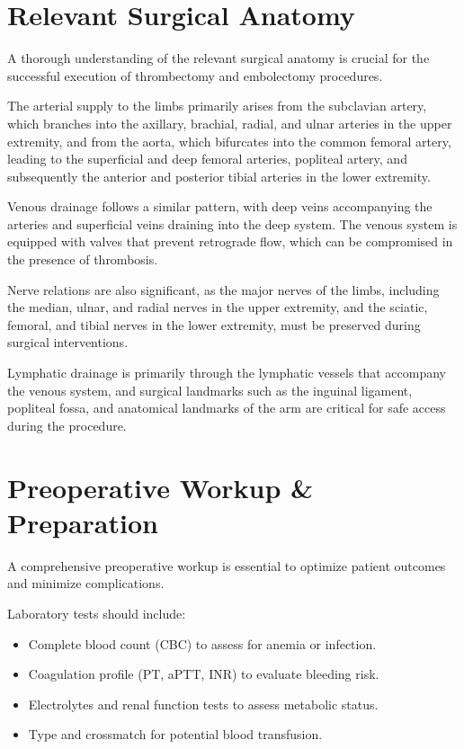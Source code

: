 \section*{Relevant Surgical Anatomy}

A thorough understanding of the relevant surgical anatomy is crucial for the successful execution of thrombectomy and embolectomy procedures. 

The arterial supply to the limbs primarily arises from the subclavian artery, which branches into the axillary, brachial, radial, and ulnar arteries in the upper extremity, and from the aorta, which bifurcates into the common femoral artery, leading to the superficial and deep femoral arteries, popliteal artery, and subsequently the anterior and posterior tibial arteries in the lower extremity.

Venous drainage follows a similar pattern, with deep veins accompanying the arteries and superficial veins draining into the deep system. The venous system is equipped with valves that prevent retrograde flow, which can be compromised in the presence of thrombosis.

Nerve relations are also significant, as the major nerves of the limbs, including the median, ulnar, and radial nerves in the upper extremity, and the sciatic, femoral, and tibial nerves in the lower extremity, must be preserved during surgical interventions.

Lymphatic drainage is primarily through the lymphatic vessels that accompany the venous system, and surgical landmarks such as the inguinal ligament, popliteal fossa, and anatomical landmarks of the arm are critical for safe access during the procedure.

\section*{Preoperative Workup \& Preparation}

A comprehensive preoperative workup is essential to optimize patient outcomes and minimize complications. 

Laboratory tests should include:

\begin{itemize}
    \item Complete blood count (CBC) to assess for anemia or infection.
    \item Coagulation profile (PT, aPTT, INR) to evaluate bleeding risk.
    \item Electrolytes and renal function tests to assess metabolic status.
    \item Type and crossmatch for potential blood transfusion.
\end{itemize}

